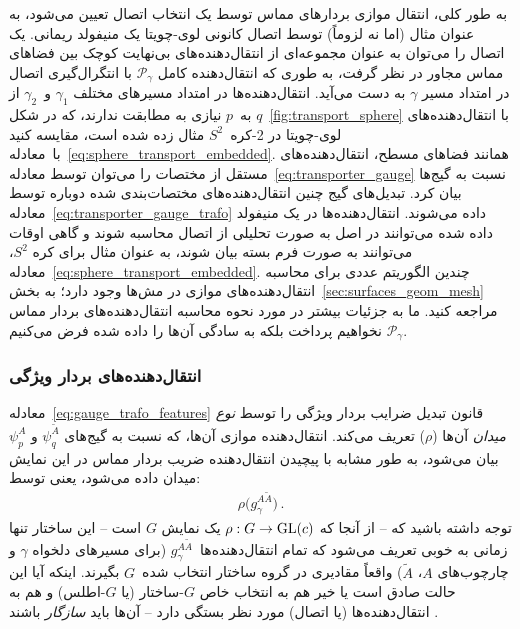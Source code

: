 به طور کلی، انتقال موازی بردارهای مماس توسط یک انتخاب اتصال تعیین می‌شود، به عنوان مثال (اما نه لزوماً) توسط اتصال کانونی لوی-چویتا یک منیفولد ریمانی.
یک اتصال را می‌توان به عنوان مجموعه‌ای از انتقال‌دهنده‌های بی‌نهایت کوچک بین فضاهای مماس مجاور در نظر گرفت، به طوری که انتقال‌دهنده کامل $\mathcal{P}_\gamma$ با انتگرال‌گیری اتصال در امتداد مسیر $\gamma$ به دست می‌آید.
انتقال‌دهنده‌ها در امتداد مسیرهای مختلف $\gamma_1$ و~$\gamma_2$ از $q$ به~$p$ نیازی به مطابقت ندارند، که در شکل~\ref{fig:transport_sphere} با انتقال‌دهنده‌های لوی-چویتا در 2-کره~$S^2$ مثال زده شده است، مقایسه کنید با~معادله~\eqref{eq:sphere_transport_embedded}.
همانند فضاهای مسطح، انتقال‌دهنده‌های مستقل از مختصات را می‌توان توسط معادله~\eqref{eq:transporter_gauge} نسبت به گیج‌ها بیان کرد.
تبدیل‌های گیج چنین انتقال‌دهنده‌های مختصات‌بندی شده دوباره توسط معادله~\eqref{eq:transporter_gauge_trafo} داده می‌شوند.
انتقال‌دهنده‌ها در یک منیفولد داده شده می‌توانند در اصل به صورت تحلیلی از اتصال محاسبه شوند \cite{gallier2019diffgeom1,nakahara2003geometry} و گاهی اوقات می‌توانند به صورت فرم بسته بیان شوند، به عنوان مثال برای کره $S^2$، معادله~\eqref{eq:sphere_transport_embedded}.
چندین الگوریتم عددی برای محاسبه انتقال‌دهنده‌های موازی در مش‌ها وجود دارد؛ به بخش~\ref{sec:surfaces_geom_mesh} مراجعه کنید.
ما به جزئیات بیشتر در مورد نحوه محاسبه انتقال‌دهنده‌های بردار مماس $\mathcal{P}_\gamma$ نخواهیم پرداخت بلکه به سادگی آن‌ها را داده شده فرض می‌کنیم.


\subsubsection{انتقال‌دهنده‌های بردار ویژگی}

معادله~\eqref{eq:gauge_trafo_features} قانون تبدیل ضرایب بردار ویژگی را توسط \emph{نوع میدان} آن‌ها ($\rho$) تعریف می‌کند.
انتقال‌دهنده موازی آن‌ها، که نسبت به گیج‌های $\psi_q^{\widetilde{A}}$ و $\psi_p^A$ بیان می‌شود، به طور مشابه با پیچیدن انتقال‌دهنده ضریب بردار مماس در این نمایش میدان داده می‌شود، یعنی توسط:
\begin{align}
	\rho\big( g_\gamma^{A\widetilde{A}} \big) \,.
\end{align}
توجه داشته باشید که -- از آنجا که $\rho:G\to\operatorname{GL}(c)$ یک نمایش $G$ است -- این ساختار تنها زمانی به خوبی تعریف می‌شود که تمام انتقال‌دهنده‌ها~$g_\gamma^{A\widetilde{A}}$ (برای مسیرهای دلخواه $\gamma$ و چارچوب‌های $A$، $\widetilde{A}$) واقعاً مقادیری در گروه ساختار انتخاب شده~$G$ بگیرند.
اینکه آیا این حالت صادق است یا خیر هم به انتخاب خاص $G$-ساختار (یا $G$-اطلس) و هم به انتقال‌دهنده‌ها (یا اتصال) مورد نظر بستگی دارد -- آن‌ها باید \emph{سازگار} باشند \cite{wendlLectureNotesBundles2008}.


